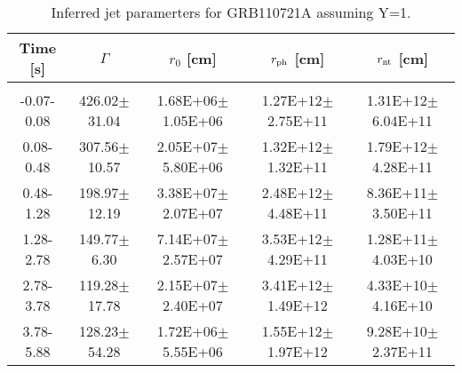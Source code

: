 \begin{table}[htp]
\scriptsize
\label{tab:}
\begin{tabular}{c c c c c}
Time [s] & $\Gamma$ & $r_0$ [cm] & $r_{\rm ph}$ [cm] & $r_{\rm nt}$ [cm] \\
\hline \hline\\ 

-0.07-0.08 & 426.02$\pm$31.04 & 1.68E+06$\pm$1.05E+06 & 1.27E+12$\pm$2.75E+11 & 1.31E+12$\pm$6.04E+11 \\ 

0.08-0.48 & 307.56$\pm$10.57 & 2.05E+07$\pm$5.80E+06 & 1.32E+12$\pm$1.32E+11 & 1.79E+12$\pm$4.28E+11 \\ 

0.48-1.28 & 198.97$\pm$12.19 & 3.38E+07$\pm$2.07E+07 & 2.48E+12$\pm$4.48E+11 & 8.36E+11$\pm$3.50E+11 \\ 

1.28-2.78 & 149.77$\pm$6.30 & 7.14E+07$\pm$2.57E+07 & 3.53E+12$\pm$4.29E+11 & 1.28E+11$\pm$4.03E+10 \\ 

2.78-3.78 & 119.28$\pm$17.78 & 2.15E+07$\pm$2.40E+07 & 3.41E+12$\pm$1.49E+12 & 4.33E+10$\pm$4.16E+10 \\ 

3.78-5.88 & 128.23$\pm$54.28 & 1.72E+06$\pm$5.55E+06 & 1.55E+12$\pm$1.97E+12 & 9.28E+10$\pm$2.37E+11 \\ 

\end{tabular}
\caption{Inferred jet paramerters for GRB110721A assuming Y=1.}
\end{table}
